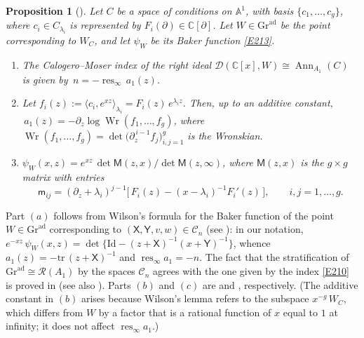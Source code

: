 \documentclass[11pt,reqno]{amsart}
\theoremstyle{plain}
\newtheorem{proposition}{Proposition}[section]
\theoremstyle{definition}
\theoremstyle{remark}
\numberwithin{equation}{section}
\newcommand{\cD}{\mathcal{D}}
\newcommand{\cC}{\mathcal{C}}
\newcommand{\cR}{\mathcal{R}}
\newcommand{\C}{\mathbb{C}}
\newcommand{\A}{\mathbb{A}}
\newcommand{\del}{\partial}
\newcommand{\Gra}{\mathrm{Gr}^{\mathrm{ad}}}
\newcommand{\lan}{\langle}
\newcommand{\ran}{\rangle}
\DeclareMathOperator{\Ann}{Ann}
\DeclareMathOperator{\Wr}{Wr}
\DeclareMathOperator{\res}{res}
\begin{document}
\begin{proposition}[\cite{Wilson1993, Wilson1998}]
\label{P2.4}
Let $C$ be a space of conditions on $\A^1$, with basis $\{c_1, \ldots, c_g\}$, where $c_i \in
C_{\lambda_i}$ is represented by $F_i(\del) \in \C[\del]$. Let $W \in \Gra$ be the point
corresponding to $W_C$, and let $\psi_W$ be its Baker function \eqref{E213}.
\begin{enumerate}
\item[$(a)$] The Calogero--Moser index of the right ideal $\cD(\C[x], W) \cong \Ann_{A_1}(C)$ is
given by $\, n = - \res_{\infty}\, a_1(z)$.
\item[$(b)$] Let $f_i(z) := \lan c_i, e^{xz} \ran_{\lambda_i} = F_i(z)\, e^{\lambda_i z}$. Then,
up to an additive constant, $\,a_1(z) = - \del_z \log \Wr(f_1, \ldots, f_g)$, where
$\Wr(f_1, \ldots, f_g) = \det\bigl(\del_z^{\,i-1} f_j\bigr)_{i,j = 1}^{g}$ is the Wronskian.
\item[$(c)$] $\psi_W(x,z) = e^{xz}\, \det \mathsf{M}(z, x)/\det \mathsf{M}(z, \infty)$, where
$\mathsf{M}(z,x)$ is the $g \times g$ matrix with entries
\[
  \mathsf{m}_{ij} = (\del_z + \lambda_i)^{j-1} \bigl[\, F_i(z) - (x - \lambda_i)^{-1} F_i'(z)
  \,\bigr] , \qquad i,j = 1, \ldots, g .
\]
\end{enumerate}
\end{proposition}

Part $(a)$ follows from Wilson's formula for the Baker function of the point $W \in \Gra$
corresponding to $(\mathsf{X}, \mathsf{Y}, v, w) \in \cC_n$ (see \cite[(3.7)]{Wilson1998}): in
our notation, $e^{-xz}\, \psi_W(x,z) = \det\{ \mathrm{Id} - (z + \mathsf{X})^{-1} (x +
\mathsf{Y})^{-1}\}$, whence $a_1(z) = - \mathrm{tr}\,(z + \mathsf{X})^{-1}$ and
$\res_\infty a_1 = -n$. The fact that the stratification of $\Gra \cong \cR(A_1)$ by the spaces
$\cC_n$ agrees with the one given by the index \eqref{E210} is proved in
\cite[Theorems~1.2 and 4.5]{BerestWilsonNC} (see also \cite[Proposition~5.2]{BerestWilsonNC}).
Parts $(b)$ and $(c)$ are \cite[Lemma~5.8]{Wilson1993} and \cite[Proposition~6.5]{Wilson1993},
respectively. (The additive constant in $(b)$ arises because Wilson's lemma refers to the subspace
$x^{-g}\, W_C$, which differs from $W$ by a factor that is a rational function of $x$ equal to $1$
at infinity; it does not affect $\res_\infty a_1$.)
\end{document}
